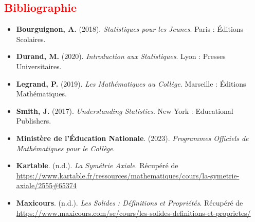 \documentclass{article}
\begin{document}
\subsection{\textcolor{red}{Bibliographie}}

\begin{itemize}
    \item \textbf{Bourguignon, A.} (2018). \textit{Statistiques pour les Jeunes}. Paris : Éditions Scolaires.
    \item \textbf{Durand, M.} (2020). \textit{Introduction aux Statistiques}. Lyon : Presses Universitaires.
    \item \textbf{Legrand, P.} (2019). \textit{Les Mathématiques au Collège}. Marseille : Éditions Mathématiques.
    \item \textbf{Smith, J.} (2017). \textit{Understanding Statistics}. New York : Educational Publishers.
    \item \textbf{Ministère de l'Éducation Nationale}. (2023). \textit{Programmes Officiels de Mathématiques pour le Collège}.
    \item \textbf{Kartable}. (n.d.). \textit{La Symétrie Axiale}. Récupéré de \url{https://www.kartable.fr/ressources/mathematiques/cours/la-symetrie-axiale/2555#65374}
    \item \textbf{Maxicours}. (n.d.). \textit{Les Solides : Définitions et Propriétés}. Récupéré de \url{https://www.maxicours.com/se/cours/les-solides-definitions-et-proprietes/}
\end{itemize}
\end{document}
